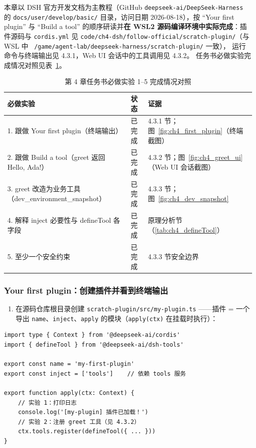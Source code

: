 本章以 DSH 官方开发文档为主教程（GitHub \nolinkurl{deepseek-ai/DeepSeek-Harness}
的 \texttt{docs/user/develop/basic/} 目录，访问日期 2026-08-18），按
``Your first plugin'' 与 ``Build a tool'' 的顺序研读并\textbf{在 WSL2
源码编译环境中实际完成}：插件源码与 \texttt{cordis.yml} 见
\nolinkurl{code/ch4-dsh/follow-official/scratch-plugin/}（与 WSL 中
\texttt{~/game/agent-lab/deepseek-harness/scratch-plugin/} 一致），
运行命令与终端输出见 4.3.1，Web UI 会话中的工具调用见 4.3.2。
任务书必做实验完成情况对照见表~\ref{tab:ch4_mustdo}。

\begin{table}[H]
\centering
\caption{第 4 章任务书必做实验 1--5 完成情况对照}
\label{tab:ch4_mustdo}
\small
\setlength{\tabcolsep}{3pt}
\begin{tabular}{p{2.6cm}p{1.6cm}p{6.9cm}}
\toprule
\textbf{必做实验} & \textbf{状态} & \textbf{证据} \\
\midrule
1. 跟做 Your first plugin（终端输出） & 已完成 & 4.3.1 节；图~\ref{fig:ch4_first_plugin}（终端截图） \\
2. 跟做 Build a tool（greet 返回 Hello, Ada!） & 已完成 & 4.3.2 节；图~\ref{fig:ch4_greet_ui}（Web UI 会话截图） \\
3. greet 改造为业务工具（dev\_environment\_snapshot） & 已完成 & 4.3.3 节；图~\ref{fig:ch4_dev_snapshot} \\
4. 解释 inject 必要性与 defineTool 各字段 & 已完成 & 原理分析节（\ref{tab:ch4_defineTool}） \\
5. 至少一个安全约束 & 已完成 & 4.3.3 节安全边界 \\
\bottomrule
\end{tabular}
\end{table}

\subsubsection{Your first plugin：创建插件并看到终端输出}

\begin{enumerate}[leftmargin=4em,itemsep=0pt,topsep=2pt]
    \item 在源码仓库根目录创建 \texttt{scratch-plugin/src/my-plugin.ts}
          ——插件 = 一个导出 \texttt{name}、\texttt{inject}、\texttt{apply}
          的模块（\texttt{apply(ctx)} 在挂载时执行）：
\end{enumerate}

\begin{verbatim}
import type { Context } from '@deepseek-ai/cordis'
import { defineTool } from '@deepseek-ai/dsh-tools'

export const name = 'my-first-plugin'
export const inject = ['tools']    // 依赖 tools 服务

export function apply(ctx: Context) {
    // 实验 1：打印日志
    console.log('[my-plugin] 插件已加载！')
    // 实验 2：注册 greet 工具（见 4.3.2）
    ctx.tools.register(defineTool({ ... }))
}
\end{verbatim}

